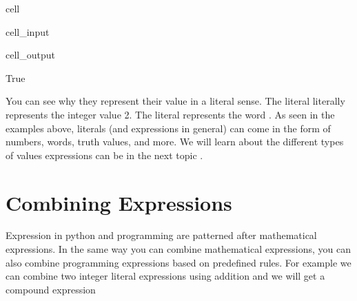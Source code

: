 \documentclass[letterpaper,10pt,english]{jupyterBook}
\begin{document}
\begin{sphinxuseclass}{cell}\begin{sphinxVerbatimInput}

\begin{sphinxuseclass}{cell_input}
\begin{sphinxVerbatim}[commandchars=\\\{\}]
\end{sphinxVerbatim}

\end{sphinxuseclass}\end{sphinxVerbatimInput}
\begin{sphinxVerbatimOutput}

\begin{sphinxuseclass}{cell_output}
\begin{sphinxVerbatim}[commandchars=\\\{\}]
True
\end{sphinxVerbatim}

\end{sphinxuseclass}\end{sphinxVerbatimOutput}

\end{sphinxuseclass}
\sphinxAtStartPar
You can see why they represent their value in a literal sense. The literal  literally represents the integer value 2. The literal  represents the word . As seen in the examples above, literals (and expressions in general) can come in the form of numbers, words, truth values, and more. We will learn about the different types of values expressions can be in the next topic .


\section{Combining Expressions}
\label{\detokenize{expressions:combining-expressions}}
\sphinxAtStartPar
Expression in python and programming are patterned after mathematical expressions. In the same way you can combine mathematical expressions, you can also combine programming expressions based on predefined rules. For example we can combine two integer literal expressions using addition and we will get a compound expression
\end{document}
